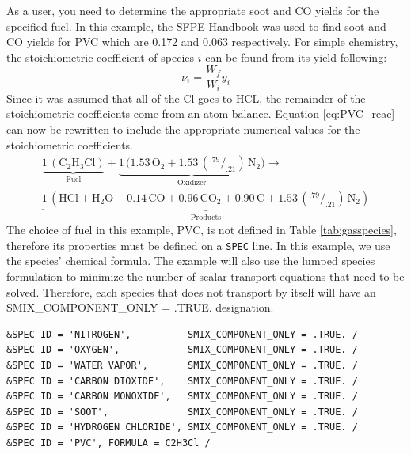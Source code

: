 \documentclass[11pt]{book}
\newcommand{\ct}{\tt\small}
\begin{document}
As a user, you need to determine the appropriate soot and CO yields for the specified fuel. In this example, the SFPE Handbook \cite{SFPE:Tewarson} was used to find soot and CO yields for PVC which are 0.172 and 0.063 respectively. For simple chemistry, the stoichiometric coefficient of species $i$ can be found from its yield following:
\begin{equation}\label{eq:stoic_yield}
\nu_{i}=\frac{W_{f}}{W_{i}}y_{i}
\end{equation}
Since it was assumed that all of the Cl goes to HCL, the remainder of the stoichiometric coefficients come from an atom balance. Equation \ref{eq:PVC_reac} can now be rewritten to include the appropriate numerical values for the stoichiometric coefficients.
\begin{eqnarray}\label{eq:PVC_reac2}
\underbrace{\mathrm{1\,(C_2H_3Cl)}}_\text{Fuel} + \underbrace{\mathrm{1\,(1.53 \, O_2+1.53 \,(^{.79}/_{.21}) \, N_2})}_\text{Oxidizer} \rightarrow \\
\nonumber \underbrace{\mathrm{1\,(HCl +  H_2O + 0.14\, CO + 0.96\, CO_2 + 0.90\, C + 1.53\,(^{.79}/_{.21}) \, N_2)}}_\text{Products}
\end{eqnarray}
The choice of fuel in this example, PVC, is not defined in Table \ref{tab:gasspecies}, therefore its properties must be defined on a {\ct SPEC} line. In this example, we use the species' chemical formula. The example will also use the lumped species formulation to minimize the number of scalar transport equations that need to be solved. Therefore, each species that does not transport by itself will have an SMIX\_COMPONENT\_ONLY = .TRUE. designation.
\footnotesize
\begin{verbatim}
&SPEC ID = 'NITROGEN',          SMIX_COMPONENT_ONLY = .TRUE. /
&SPEC ID = 'OXYGEN',            SMIX_COMPONENT_ONLY = .TRUE. /
&SPEC ID = 'WATER VAPOR',       SMIX_COMPONENT_ONLY = .TRUE. /
&SPEC ID = 'CARBON DIOXIDE',    SMIX_COMPONENT_ONLY = .TRUE. /
&SPEC ID = 'CARBON MONOXIDE',   SMIX_COMPONENT_ONLY = .TRUE. /
&SPEC ID = 'SOOT',              SMIX_COMPONENT_ONLY = .TRUE. /
&SPEC ID = 'HYDROGEN CHLORIDE', SMIX_COMPONENT_ONLY = .TRUE. /
&SPEC ID = 'PVC', FORMULA = C2H3Cl /
\end{verbatim} \normalsize
\end{document}
